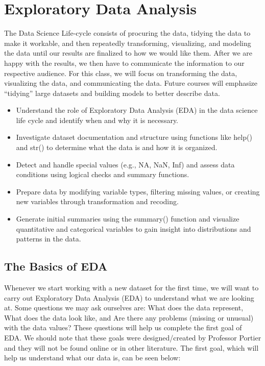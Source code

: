 \documentclass[
  letterpaper,
  DIV=11,
  numbers=noendperiod]{scrreprt}
\providecommand{\tightlist}{%
  \setlength{\itemsep}{0pt}\setlength{\parskip}{0pt}}
\begin{document}
\chapter{Exploratory Data Analysis}\label{exploratory-data-analysis}

The Data Science Life-cycle consists of procuring the data, tidying the
data to make it workable, and then repeatedly transforming, visualizing,
and modeling the data until our results are finalized to how we would
like them. After we are happy with the results, we then have to
communicate the information to our respective audience. For this class,
we will focus on transforming the data, visualizing the data, and
communicating the data. Future courses will emphasize ``tidying'' large
datasets and building models to better describe data.

\begin{itemize}
\tightlist
\item
  Understand the role of Exploratory Data Analysis (EDA) in the data
  science life cycle and identify when and why it is necessary.
\item
  Investigate dataset documentation and structure using functions like
  help() and str() to determine what the data is and how it is
  organized.
\item
  Detect and handle special values (e.g., NA, NaN, Inf) and assess data
  conditions using logical checks and summary functions.
\item
  Prepare data by modifying variable types, filtering missing values, or
  creating new variables through transformation and recoding.
\item
  Generate initial summaries using the summary() function and visualize
  quantitative and categorical variables to gain insight into
  distributions and patterns in the data.
\end{itemize}

\section{The Basics of EDA}\label{the-basics-of-eda}

Whenever we start working with a new dataset for the first time, we will
want to carry out Exploratory Data Analysis (EDA) to understand what we
are looking at. Some questions we may ask ourselves are: What does the
data represent, What does the data look like, and Are there any problems
(missing or unusual) with the data values? These questions will help us
complete the first goal of EDA. We should note that these goals were
designed/created by Professor Portier and they will not be found online
or in other literature. The first goal, which will help us understand
what our data is, can be seen below:
\end{document}
